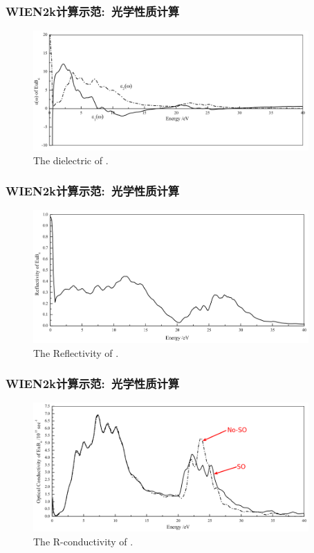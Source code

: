 \frame
{
	\frametitle{\textrm{WIEN2k}计算示范:~光学性质计算}
\vspace*{-5pt}
\begin{figure}[h!]
\centering
\includegraphics[width=4.15in]{Figures/WIEN2k_EuB6-epsil.png}
\caption{\tiny \textrm{The dielectric of .}}%
\label{Fig:WIEN2k_EuB6-dielectric}
\end{figure}
}

\frame
{
	\frametitle{\textrm{WIEN2k}计算示范:~光学性质计算}
\vspace*{-5pt}
\begin{figure}[h!]
\centering
\includegraphics[width=4.15in]{Figures/WIEN2k_EuB6-Reflect.png}
\caption{\tiny \textrm{The Reflectivity of .}}%
\label{Fig:WIEN2k_EuB6-Reflectivity}
\end{figure}
}

\frame
{
	\frametitle{\textrm{WIEN2k}计算示范:~光学性质计算}
\vspace*{-5pt}
\begin{figure}[h!]
\centering
\includegraphics[width=4.15in]{Figures/WIEN2k_EuB6-Conduct.png}
\caption{\tiny \textrm{The R-conductivity of .}}%
\label{Fig:WIEN2k_EuB6-conductivity}
\end{figure}
}

